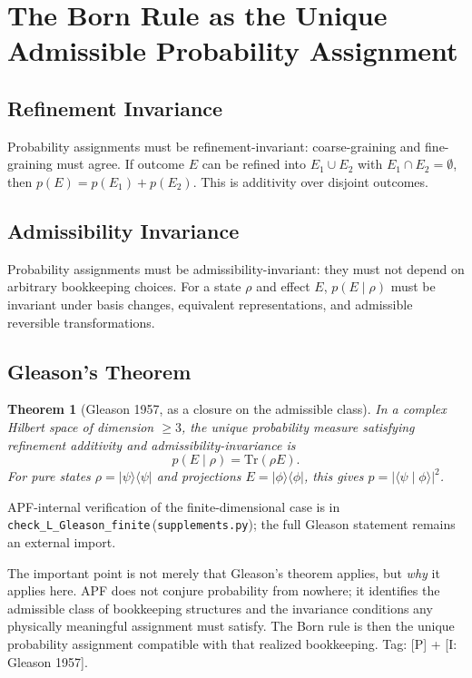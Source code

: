 \documentclass[11pt]{article}
\newtheorem{theorem}{Theorem}[section]
\newcommand{\coderef}[2]{\texttt{#1}\,(\texttt{#2})}
\begin{document}
\section{The Born Rule as the Unique Admissible Probability Assignment}\label{sec:born}

\subsection{Refinement Invariance}
Probability assignments must be refinement-invariant: coarse-graining and
fine-graining must agree. If outcome $E$ can be refined into $E_1 \cup E_2$ with
$E_1 \cap E_2 = \emptyset$, then $p(E) = p(E_1) + p(E_2)$. This is additivity over
disjoint outcomes.

\subsection{Admissibility Invariance}
Probability assignments must be admissibility-invariant: they must not depend on
arbitrary bookkeeping choices. For a state $\rho$ and effect $E$, $p(E\mid\rho)$
must be invariant under basis changes, equivalent representations, and admissible
reversible transformations.

\subsection{Gleason's Theorem}
\begin{theorem}[Gleason 1957, as a closure on the admissible class]
In a complex Hilbert space of dimension $\geq 3$, the unique probability measure
satisfying refinement additivity and admissibility-invariance is
\[
p(E\mid\rho) = \mathrm{Tr}(\rho E).
\]
For pure states $\rho = \lvert\psi\rangle\langle\psi\rvert$ and projections
$E = \lvert\phi\rangle\langle\phi\rvert$, this gives $p = \lvert\langle\psi\mid\phi\rangle\rvert^2$.
\end{theorem}
APF-internal verification of the finite-dimensional case is in
\coderef{check\_L\_Gleason\_finite}{supplements.py}; the full Gleason statement
remains an external import.

\begin{bridgebox}
The important point is not merely that Gleason's theorem applies, but \emph{why}
it applies here. APF does not conjure probability from nowhere; it identifies the
admissible class of bookkeeping structures and the invariance conditions any
physically meaningful assignment must satisfy. The Born rule is then the unique
probability assignment compatible with that realized bookkeeping. Tag: [P] + [I:
Gleason 1957].
\end{bridgebox}
\end{document}
